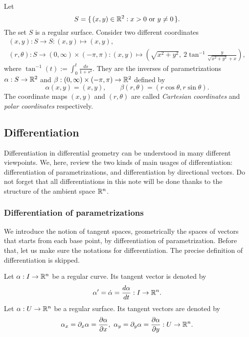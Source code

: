 \documentclass{../exp}
\def\a{\alpha}
\begin{document}
\begin{ex}
Let
\[S=\{\,(x,y)\in\mathbb{R}^2:x>0\text{ or }y\ne0\,\}.\]
The set $S$ is a regular surface.
Consider two different coordinates
\begin{gather*}
(x,y):S\to S:(x,y)\mapsto(x,y),\\
(r,\theta):S\to(0,\infty)\times(-\pi,\pi):(x,y)\mapsto\left(\sqrt{x^2+y^2},\ 2\tan^{-1}\frac y{\sqrt{x^2+y^2}+x}\right),
\end{gather*}
where $\tan^{-1}(t):=\int_0^t\frac{ds}{1+s^2}$.
They are the inverses of parametrizations $\a:S\to\R^2$ and $\beta:(0,\infty)\times(-\pi,\pi)\to\R^2$ defined by
\[\a(x,y)=(x,y),\qquad\beta(r,\theta)=(r\cos\theta,r\sin\theta).\]
The coordinate maps $(x,y)$ and $(r,\theta)$ are called \emph{Cartesian coordinates} and \emph{polar coordinates} respectively.
\end{ex}

 


\subsection{Differentiation}
Differentiation in differential geometry can be understood in many different viewpoints.
We, here, review the two kinds of main usages of differentiation: differentiation of parametrizations, and differentiation by directional vectors.
Do not forget that all differentiations in this note will be done thanks to the structure of the ambient space $\mathbb{R}^n$.

\subsubsection{Differentiation of parametrizations}
We introduce the notion of tangent spaces, geometrically the spaces of vectors that starts from each base point, by differentiation of parametrization.
Before that, let us make sure the notations for differentiation.
The precise definition of differentiation is skipped.

\begin{notn*}
Let $\a:I\to\R^n$ be a regular curve.
Its tangent vector is denoted by
\[\a'=\dot\a=\dd{\a}{t}:I\to\R^n.\]
Let $\a:U\to\R^n$ be a regular surface.
Its tangent vectors are denoted by
\[\a_x=\pd_x\a=\pd{\a}{x},\ \a_y=\pd_y\a=\pd{\a}{y}:U\to\R^n.\]
\end{notn*}
\end{document}
